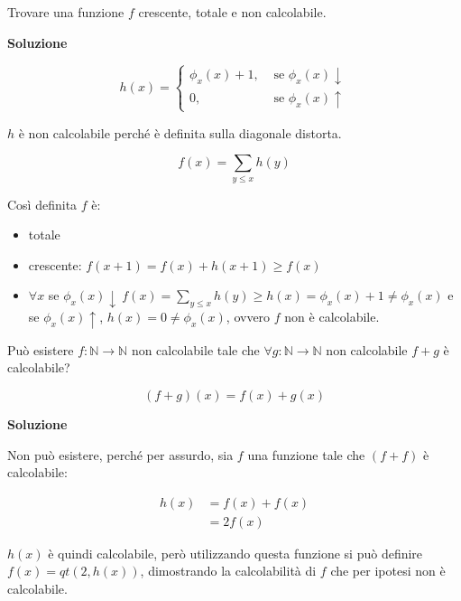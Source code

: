 
Trovare una funzione $ f $ crescente, totale e non calcolabile.

\textbf{Soluzione}

$$
h(x) = \begin{cases}
\phi_x(x)+1, &\text{ se }\phi_x(x)\downarrow \\
0, &\text{ se } \phi_x(x) \uparrow
\end{cases}
$$

$ h $ è non calcolabile perché è definita sulla diagonale distorta.

$$
f(x) = \sum\limits_{y \leq x} h(y)
$$

Così definita $ f $ è:
\begin{itemize}
	\item totale
	\item crescente: $ f(x+1) = f(x) + h(x+1) \geq f(x) $
	\item $ \forall x $ se $ \phi_x(x) \downarrow \: f(x) = \sum\limits_{y \leq x} h(y) \geq h(x) = \phi_x(x) +1 \neq \phi_x(x) $ e se $ \phi_x(x) \uparrow $, $ h(x) = 0 \neq \phi_x(x) $, ovvero $ f $ non è calcolabile.
\end{itemize}


Può esistere $ f : \mathbb{N} \rightarrow \mathbb{N} $ non calcolabile tale che $ \forall g : \mathbb{N} \rightarrow \mathbb{N} $ non calcolabile $ f+g  $ è calcolabile?

$$
(f+g)(x) = f(x) + g(x)
$$

\textbf{Soluzione}

Non può esistere, perché per assurdo, sia $ f $ una funzione tale che $ (f+f) $ è calcolabile:

\begin{align*}
h(x) &= f(x) + f(x) \\
		&= 2 f(x)
\end{align*}

$h(x)$ è quindi calcolabile, però utilizzando questa funzione si può definire $ f(x) = qt(2, h(x)) $, dimostrando la calcolabilità di $ f $ che per ipotesi non è calcolabile.


